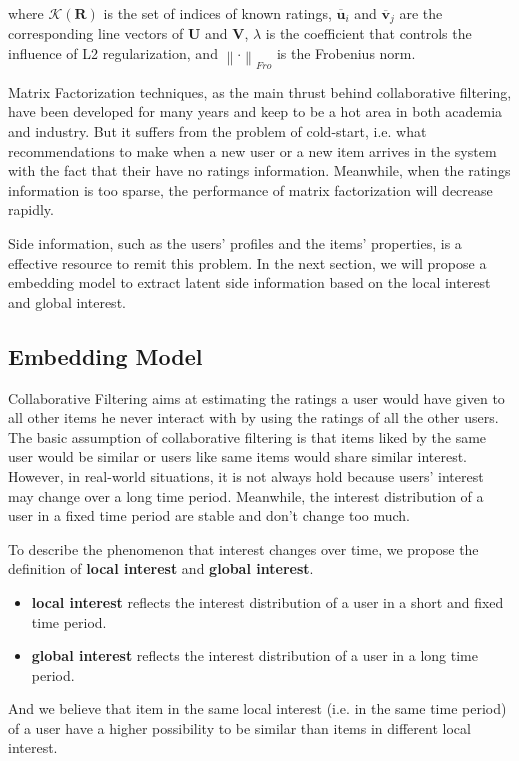 \documentclass{sig-alternate-05-2015}
\begin{document}
where $\mathcal{K}(\mathbf{R})$ is the set of indices of known ratings,
$\overline{\mathbf{u}}_i$ and $\overline{\mathbf{v}}_j$
are the corresponding line vectors of $\mathbf{U}$ and $\mathbf{V}$,
$\lambda$ is the coefficient that controls the influence of L2 regularization,
and $\left\| \cdot \right\|_{Fro}$ is the Frobenius norm.

Matrix Factorization techniques, as the main thrust behind collaborative filtering,
have been developed for many years and keep to be a hot area in both academia and industry.
But it suffers from the problem of cold-start,
i.e. what recommendations to make when a new user or a new item arrives in the system
with the fact that their have no ratings information.
Meanwhile, when the ratings information is too sparse,
the performance of matrix factorization will decrease rapidly.

Side information, such as the users' profiles and the items' properties,
is a effective resource to remit this problem.
In the next section, we will propose a embedding model
to extract latent side information based on the local interest and global interest.

\subsection{Embedding Model}
Collaborative Filtering aims at estimating the ratings
a user would have given to all other items he never interact with
by using the ratings of all the other users.
The basic assumption of collaborative filtering is that
items liked by the same user would be similar
or users like same items would share similar interest.
However, in real-world situations,
it is not always hold because users' interest may change over
a long time period.
Meanwhile, the interest distribution of a user in a fixed time period
are stable and don't change too much.

To describe the phenomenon that interest changes over time,
we propose the definition of \textbf{local interest} and \textbf{global interest}.

\begin{itemize}
\item \textbf{local interest} reflects the interest distribution of a user
in a short and fixed time period.
\item \textbf{global interest} reflects the interest distribution of a user
in a long time period.
\end{itemize}

And we believe that item in the same local interest (i.e. in the same time period)
of a user have a higher possibility to be similar than
items in different local interest.
\end{document}
